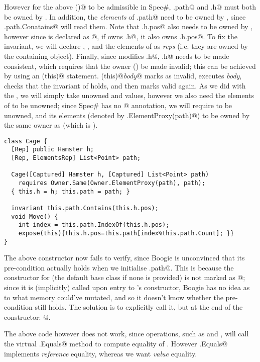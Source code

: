 However for the above \Q@invariant()@ to be admissible in Spec\#, \Q@this.path@ and \Q@this.h@ must both be owned by \Q@this@. In addition, the \emph{elements} of \Q@this.path@ need to be owned by \Q@this@, since \Q@this.path.Conatains@ will read them. Note that \Q@this.h.pos@ also needs to be owned by \Q@this@, however since \Q@pos@ is declared as \Q@[Peer]@, if \Q@this@ owns \Q@this.h@, it also owns \Q@this.h.pos@. To fix the invariant, we will declare \Q@h@, \Q@path@, and the elements of \Q@path@ as \emph{reps} (i.e. they are owned by the containing object). Finally, since \Q@Move@ modifies \Q@this.h@, \Q@this.h@ needs to be made consistent, which requires that the owner (\Q@this@) be made invalid; this can be achieved by using an \Q@expose(this)@ statement. \Q@expose(this){@\emph{body}\Q@}@ marks \Q@this@ as invalid, executes \emph{body}, checks that the invariant of \Q@this@ holds, and then marks \Q@this@ valid again.
As we did with the \Q@Hamster@, we will simply take unowned \Q@h@ and \Q@path@ values, however we also need the elements of \Q@path@ to be unowned; since Spec\# has no \Q@[ElementsCaptured]@ annotation, we will require \Q@path@ to be unowned, and its elements (denoted by \Q@Owner.ElementProxy(path)@) to be owned by the same owner as \Q@path@ (which is \Q@null@).
\begin{lstlisting}
class Cage {
  [Rep] public Hamster h;
  [Rep, ElementsRep] List<Point> path;
	
  Cage([Captured] Hamster h, [Captured] List<Point> path)
    requires Owner.Same(Owner.ElementProxy(path), path);
  { this.h = h; this.path = path; }
	
  invariant this.path.Contains(this.h.pos);
  void Move() { 
    int index = this.path.IndexOf(this.h.pos);
    expose(this){this.h.pos=this.path[index%this.path.Count]; }} 
}
\end{lstlisting}

The above constructor now fails to verify, since Boogie is unconvinced that its pre-condition actually holds when we initialise \Q@this.path@. This is because the constructor for \Q@Object@ (the default base class if none is provided) is not marked as \Q@[Pure]@; since it is (implicitly) called upon entry to \Q@Cage@'s constructor, Boogie has no idea as to what memory could've mutated, and so it doesn't know whether the pre-condition still holds. The solution is to explicitly call it, but at the end of the constructor: @.

The above \Q@Cage@ code however does not work, since \Q@List@ operations, such as \Q@Contains@ and \Q@IndexOf@, will call the virtual \Q@Object.Equals@ method to compute equality of \Q@Point@s. However \Q@Object.Equals@ implements \emph{reference} equality, whereas we want \emph{value} equality.


